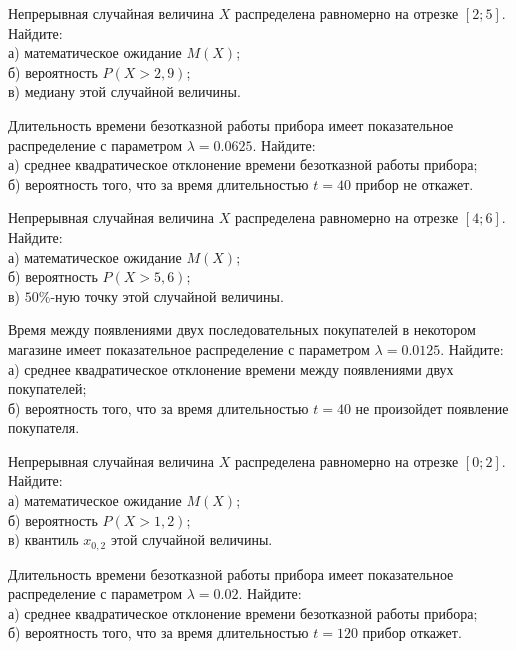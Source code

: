\vfill

\newpage\setcounter{zad}{0}

\z Непрерывная случайная величина $X$ распределена равномерно на отрезке $[2; 5]$. Найдите: \\ \quad а) математическое ожидание $M(X)$; \\ \quad б) вероятность $P(X>2{,}9)$; \\ \quad в) медиану этой случайной величины.


\vfill

\z Длительность времени безотказной работы прибора имеет показательное распределение с параметром $\lambda = 0.0625$. Найдите: \\ \quad а) среднее квадратическое отклонение времени безотказной работы прибора; \\ \quad б) вероятность того, что за время длительностью $t = 40$ прибор не откажет.
 

\vfill

\newpage\setcounter{zad}{0}

\z Непрерывная случайная величина $X$ распределена равномерно на отрезке $[4; 6]$. Найдите: \\ \quad а) математическое ожидание $M(X)$; \\ \quad б) вероятность $P(X>5{,}6)$; \\ \quad в) $50\%$-ную точку этой случайной величины.


\vfill

\z Время между появлениями двух последовательных покупателей в некотором магазине имеет показательное распределение с параметром $\lambda = 0.0125$. Найдите: \\ \quad а) среднее квадратическое отклонение времени между появлениями двух покупателей; \\ \quad б) вероятность того, что за время длительностью $t = 40$ не произойдет появление покупателя.
 

\vfill

\newpage\setcounter{zad}{0}

\z Непрерывная случайная величина $X$ распределена равномерно на отрезке $[0; 2]$. Найдите: \\ \quad а) математическое ожидание $M(X)$; \\ \quad б) вероятность $P(X>1{,}2)$; \\ \quad в) квантиль $x_{0{,}2}$ этой случайной величины.


\vfill

\z Длительность времени безотказной работы прибора имеет показательное распределение с параметром $\lambda = 0.02$. Найдите: \\ \quad а) среднее квадратическое отклонение времени безотказной работы прибора; \\ \quad б) вероятность того, что за время длительностью $t = 120$ прибор  откажет.
 

